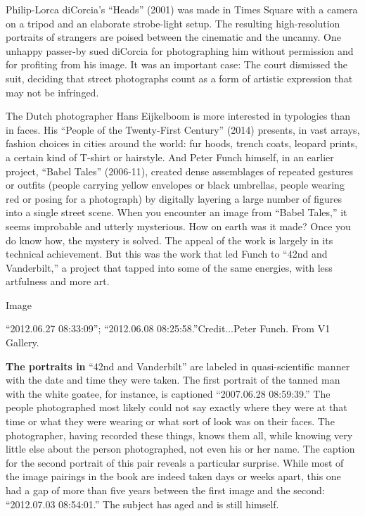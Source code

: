 Philip-Lorca diCorcia's ``Heads'' (2001) was made in Times Square with a
camera on a tripod and an elaborate strobe-light setup. The resulting
high-resolution portraits of strangers are poised between the cinematic
and the uncanny. One unhappy passer-by sued diCorcia for photographing
him without permission and for profiting from his image. It was an
important case: The court dismissed the suit, deciding that street
photographs count as a form of artistic expression that may not be
infringed.

The Dutch photographer Hans Eijkelboom is more interested in typologies
than in faces. His ``People of the Twenty-First Century'' (2014)
presents, in vast arrays, fashion choices in cities around the world:
fur hoods, trench coats, leopard prints, a certain kind of T-shirt or
hairstyle. And Peter Funch himself, in an earlier project, ``Babel
Tales'' (2006-11), created dense assemblages of repeated gestures or
outfits (people carrying yellow envelopes or black umbrellas, people
wearing red or posing for a photograph) by digitally layering a large
number of figures into a single street scene. When you encounter an
image from ``Babel Tales,'' it seems improbable and utterly mysterious.
How on earth was it made? Once you do know how, the mystery is solved.
The appeal of the work is largely in its technical achievement. But this
was the work that led Funch to ``42nd and Vanderbilt,'' a project that
tapped into some of the same energies, with less artfulness and more
art.

Image

``2012.06.27 08:33:09''; ``2012.06.08 08:25:58.''Credit...Peter Funch.
From V1 Gallery.

\textbf{The portraits in} ``42nd and Vanderbilt'' are labeled in
quasi-scientific manner with the date and time they were taken. The
first portrait of the tanned man with the white goatee, for instance, is
captioned ``2007.06.28 08:59:39.'' The people photographed most likely
could not say exactly where they were at that time or what they were
wearing or what sort of look was on their faces. The photographer,
having recorded these things, knows them all, while knowing very little
else about the person photographed, not even his or her name. The
caption for the second portrait of this pair reveals a particular
surprise. While most of the image pairings in the book are indeed taken
days or weeks apart, this one had a gap of more than five years between
the first image and the second: ``2012.07.03 08:54:01.'' The subject has
aged and is still himself.

